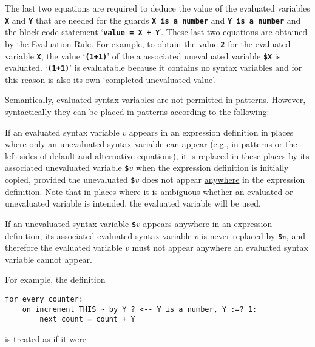 \documentclass[12pt]{article}
\newcommand{\TT}[1]{{\tt \bfseries #1}}
\newcommand{\key}[1]{{\rm \bfseries #1}}
\newenvironment{indpar}[1][0.3in]%
	{\begin{list}{}%
		     {\setlength{\itemsep}{0in}%
		      \setlength{\topsep}{0in}%
		      \setlength{\parsep}{1ex}%
		      \setlength{\labelwidth}{#1}%
		      \setlength{\leftmargin}{#1}%
		      \addtolength{\leftmargin}{\labelsep}}%
	 \item}%
	{\end{list}}
\begin{document}
The last two equations are required to deduce the value of the evaluated
variables \TT{X} and \TT{Y} that are needed for the guards
\TT{X is a number} and \TT{Y is a number} and the block code statement
`\TT{value = X + Y}'.  These last two equations are obtained by
the Evaluation Rule.  For example, to obtain the value \TT{2} for the
evaluated variable \TT{X}, the value `\TT{(1+1)}' of the a associated
unevaluated variable \TT{\$X} is evaluated.  `\TT{(1+1)}' is
evaluatable because it contains no syntax variables and for this reason is
also its own `completed unevaluated value'.

Semantically, evaluated syntax variables are not permitted in patterns.
However, syntactically they can be placed in patterns according to the
following:

\begin{indpar}
\begin{list}{}{}
\item [\key{Evaluated Variable Promotion Rule}%
:]%
\label{EVALUATED-VARIABLE-PROMOTION-RULE}
If an evaluated syntax variable $v$ appears in an expression definition
in places where only an unevaluated syntax variable can appear
(e.g., in patterns or the left sides of default and alternative
equations), it is
replaced in these places by its associated unevaluated variable
\TT{\$}$v$ when the expression definition is initially copied,
provided the unevaluated \TT{\$}$v$ does not appear \underline{anywhere}
in the expression definition.  Note that in places where it is ambiguous
whether an evaluated or unevaluated variable is intended, the evaluated
variable will be used.

If an unevaluated syntax variable \TT{\$}$v$ appears anywhere in
an expression definition, its associated evaluated syntax variable $v$
is \underline{never} replaced by \TT{\$}$v$, and therefore the evaluated
variable $v$ must not appear anywhere an evaluated syntax variable
cannot appear.
\end{list}
\end{indpar}

For example, the definition

\begin{indpar}\begin{verbatim}
for every counter:
    on increment THIS ~ by Y ? <-- Y is a number, Y :=? 1:
        next count = count + Y
\end{verbatim}\end{indpar}

is treated as if it were
\end{document}
